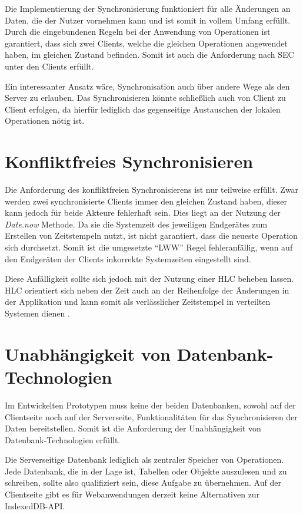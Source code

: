 \documentclass[a4paper, 12pt]{scrreprt}
\begin{document}
Die Implementierung der Synchronisierung funktioniert für alle Änderungen an Daten, die der Nutzer vornehmen kann und ist somit in vollem Umfang erfüllt. Durch die eingebundenen Regeln bei der Anwendung von Operationen ist garantiert, dass sich zwei Clients, welche die gleichen Operationen angewendet haben, im gleichen Zustand befinden. Somit ist auch die Anforderung nach \ac{SEC} unter den Clients erfüllt. 

Ein interessanter Ansatz wäre, Synchronisation auch über andere Wege als den Server zu erlauben. Das Synchronisieren könnte schließlich auch von Client zu Client erfolgen, da hierfür lediglich das gegenseitige Austauschen der lokalen Operationen nötig ist.

\section{Konfliktfreies Synchronisieren}
Die Anforderung des konfliktfreien Synchronisierens ist nur teilweise erfüllt. Zwar werden zwei synchronisierte Clients immer den gleichen Zustand haben, dieser kann jedoch für beide Akteure fehlerhaft sein. Dies liegt an der Nutzung der \textit{Date.now} Methode. Da sie die Systemzeit des jeweiligen Endgerätes zum Erstellen von Zeitstempeln nutzt, ist nicht garantiert, dass die neueste Operation sich durchsetzt. Somit ist die umgesetzte \enquote{LWW} Regel fehleranfällig, wenn auf den Endgeräten der Clients inkorrekte Systemzeiten eingestellt sind.

Diese Anfälligkeit sollte sich jedoch mit der Nutzung einer \ac{HLC} beheben lassen. \ac{HLC} orientiert sich neben der Zeit auch an der Reihenfolge der Änderungen in der Applikation und kann somit als verlässlicher Zeitstempel in verteilten Systemen dienen \autocite[S. 1]{InproceedingsHLC}. 


\section{Unabhängigkeit von Datenbank-Technologien}

Im Entwickelten Prototypen muss keine der beiden Datenbanken, sowohl auf der Clientseite noch auf der Serverseite, Funktionalitäten für das Synchronisieren der Daten bereitstellen. Somit ist die Anforderung der Unabhängigkeit von Datenbank-Technologien erfüllt. 

Die Serverseitige Datenbank lediglich als zentraler Speicher von Operationen. Jede Datenbank, die in der Lage ist, Tabellen oder Objekte auszulesen und zu schreiben, sollte also qualifiziert sein, diese Aufgabe zu übernehmen. Auf der Clientseite gibt es für Webanwendungen derzeit keine Alternativen zur IndexedDB-API. 
\end{document}
